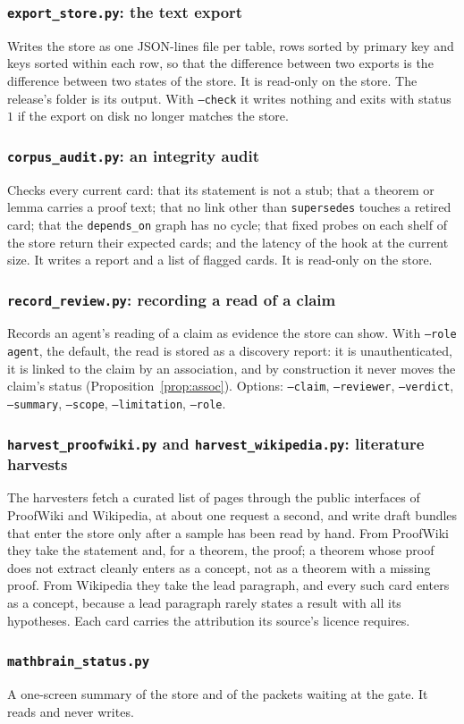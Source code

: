 \subsubsection*{\texttt{export\_store.py}: the text export}
Writes the store as one JSON-lines file per table, rows sorted by primary key and keys sorted within each row, so that the difference between two exports is the difference between two states of the store. It is read-only on the store. The release's  folder is its output. With \texttt{--check} it writes nothing and exits with status $1$ if the export on disk no longer matches the store.

\subsubsection*{\texttt{corpus\_audit.py}: an integrity audit}
Checks every current card: that its statement is not a stub; that a theorem or lemma carries a proof text; that no link other than \texttt{supersedes} touches a retired card; that the \texttt{depends\_on} graph has no cycle; that fixed probes on each shelf of the store return their expected cards; and the latency of the hook at the current size. It writes a report and a list of flagged cards. It is read-only on the store.

\subsubsection*{\texttt{record\_review.py}: recording a read of a claim}
Records an agent's reading of a claim as evidence the store can show. With \texttt{--role agent}, the default, the read is stored as a discovery report: it is unauthenticated, it is linked to the claim by an association, and by construction it never moves the claim's status (Proposition~\ref{prop:assoc}). Options: \texttt{--claim}, \texttt{--reviewer}, \texttt{--verdict}, \texttt{--summary}, \texttt{--scope}, \texttt{--limitation}, \texttt{--role}.

\subsubsection*{\texttt{harvest\_proofwiki.py} and \texttt{harvest\_wikipedia.py}: literature harvests}
The harvesters fetch a curated list of pages through the public interfaces of ProofWiki and Wikipedia, at about one request a second, and write draft bundles that enter the store only after a sample has been read by hand. From ProofWiki they take the statement and, for a theorem, the proof; a theorem whose proof does not extract cleanly enters as a concept, not as a theorem with a missing proof. From Wikipedia they take the lead paragraph, and every such card enters as a concept, because a lead paragraph rarely states a result with all its hypotheses. Each card carries the attribution its source's licence requires.

\subsubsection*{\texttt{mathbrain\_status.py}}
A one-screen summary of the store and of the packets waiting at the gate. It reads and never writes.
